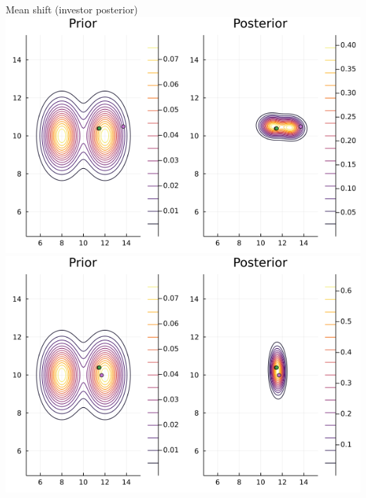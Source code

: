 \documentclass[
  ignorenonframetext,
]{beamer}
\begin{document}
\begin{frame}{Mean shift (investor posterior)}
\protect\hypertarget{mean-shift-investor-posterior}{}
\includegraphics[width=0.4\paperwidth]{complexity_files/figure-beamer/unnamed-chunk-12-1}
\includegraphics[width=0.4\paperwidth]{complexity_files/figure-beamer/unnamed-chunk-12-2}
\end{frame}
\end{document}

